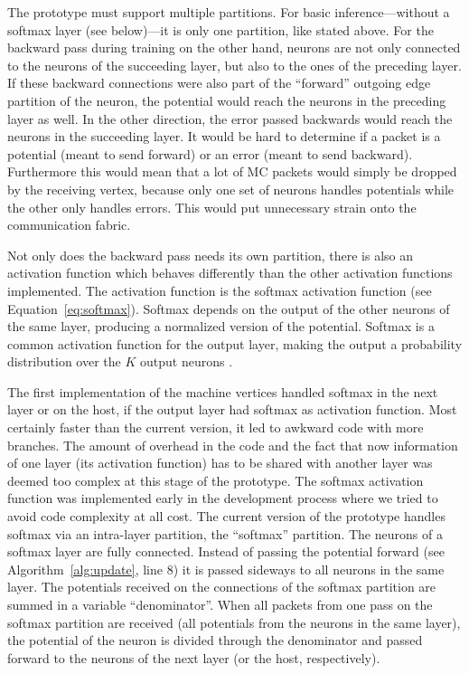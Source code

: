 \documentclass[]{article}
\begin{document}
The prototype must support multiple partitions.
For basic inference---without a softmax layer (see below)---it is only
one partition, like stated above.
For the backward pass during training on the other hand, neurons are
not only connected to the neurons of the succeeding layer, but also
to the ones of the preceding layer.
If these backward connections were also part of the ``forward''
outgoing edge partition of the neuron, the potential would reach the
neurons in the preceding layer as well.
In the other direction, the error passed backwards would reach the
neurons in the succeeding layer.
It would be hard to determine if a packet is a potential (meant to
send forward) or an error (meant to send backward).
Furthermore this would mean that a lot of MC packets would simply
be dropped by the receiving vertex, because only one set of neurons
handles potentials while the other only handles errors.
This would put unnecessary strain onto the communication fabric.

Not only does the backward pass needs its own partition, there is
also an activation function which behaves differently than the other
activation functions implemented.
The activation function is the softmax activation function
(see Equation~\ref{eq:softmax}).
Softmax depends on the output of the other neurons of the same layer,
producing a normalized version of the potential.
Softmax is a common activation function for the output layer, making
the output a probability distribution over the $K$ output neurons
\citep{goodfellow_et_al_2016}.

The first implementation of the machine vertices handled softmax
in the next layer or on the host, if the output layer had softmax as
activation function.
Most certainly faster than the current version, it led to awkward
code with more branches.
The amount of overhead in the code and the fact that now information
of one layer (its activation function) has to be shared with another
layer was deemed too complex at this stage of the prototype.
The softmax activation function was implemented early in the
development process where we tried to avoid code complexity at all
cost.
The current version of the prototype handles softmax via an
intra-layer partition, the ``softmax'' partition.
The neurons of a softmax layer are fully connected.
Instead of passing the potential forward (see
Algorithm~\ref{alg:update}, line 8) it is passed sideways to all
neurons in the same layer.
The potentials received on the connections of the softmax partition
are summed in a variable ``denominator''.
When all packets from one pass on the softmax partition are received
(all potentials from the neurons in the same layer), the potential of
the neuron is divided through the denominator and passed forward to
the neurons of the next layer (or the host, respectively).
\end{document}
